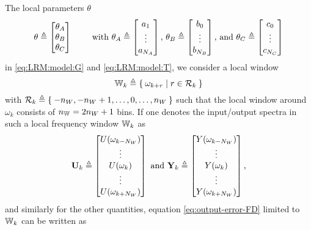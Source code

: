 The local parameters $\theta$  
\begin{equation}
\theta \isdef 
\begin{bmatrix}
\theta_A\\ 
\theta_B\\
\theta_C
\end{bmatrix}
\qquad \text{ with }
\theta_A \isdef
\begin{bmatrix}
a_1\\ \vdots\\ a_{\order{A}}
\end{bmatrix}
\text{, }
\theta_B \isdef
\begin{bmatrix}
b_0\\ \vdots\\ b_{\order{B}}
\end{bmatrix}
\text{, and }
\theta_C \isdef
\begin{bmatrix}
c_0\\ \vdots\\ c_{\order{C}}
\end{bmatrix}
\end{equation}
in \eqref{eq:LRM:model:G} and \eqref{eq:LRM:model:T}, we consider a local window
\begin{equation}
  \LocalWindow[k] 
  \isdef
  \Set{
    \omega_{k+r} 
    | 
    r \in \LocalShifts{k}
  }
\end{equation}
with $\LocalShifts{k} \isdef \Set{-\numel{W}, -\numel{W}+1, \ldots, 0, \ldots, \numel{W}}$
such that the local window around $\omega_k$ consists of $\numel{\LocalWindow} = 2 \numel{W} + 1$ bins. 
If one denotes the input/output spectra in such a local frequency window $\LocalWindow[k]$ as
\begin{equation}
  \LocalVector{U}_k \isdef 
  \mat{
    U(\omega_{k-N_W})\\
    \vdots\\
    U(\omega_{k})\\
    \vdots\\
    U(\omega_{k+N_W})\\
  }
  \text{ and }
  \LocalVector{Y}_k \isdef 
  \mat{
    Y(\omega_{k-N_W})\\
    \vdots\\
    Y(\omega_{k})\\
    \vdots\\
    Y(\omega_{k+N_W})\\
  }
  \text{,}
\end{equation}
and similarly for the other quantities, equation \eqref{eq:output-error-FD} limited to $\LocalWindow[k]$ can be written as

